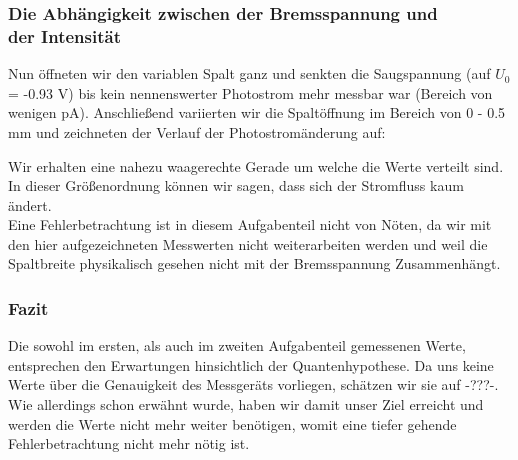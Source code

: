 \subsubsection{Die Abhängigkeit zwischen der Bremsspannung und\\ der Intensität}

Nun öffneten wir den variablen Spalt ganz und senkten die Saugspannung (auf \(U_0\) = -0.93 V) bis kein nennenswerter Photostrom mehr messbar war (Bereich von wenigen pA). Anschließend variierten wir die Spaltöffnung im Bereich von 0 - 0.5 mm und zeichneten der Verlauf der Photostromänderung auf: 

\begin{center}
\begin{minipage}{\linewidth}
\centering
{}
\label{sps}
\end{minipage}
\end{center}

Wir erhalten eine nahezu waagerechte Gerade um welche die Werte verteilt sind. In dieser Größenordnung können wir sagen, dass sich der Stromfluss kaum ändert.\\

Eine Fehlerbetrachtung ist in diesem Aufgabenteil nicht von Nöten, da wir mit den hier aufgezeichneten Messwerten nicht weiterarbeiten werden und weil die Spaltbreite physikalisch gesehen nicht mit der Bremsspannung Zusammenhängt.

\subsubsection{Fazit}
Die sowohl im ersten, als auch im zweiten Aufgabenteil gemessenen Werte, entsprechen den Erwartungen hinsichtlich der Quantenhypothese. Da uns keine Werte über die Genauigkeit des Messgeräts vorliegen, schätzen wir sie auf -???-. Wie allerdings schon erwähnt wurde, haben wir damit unser Ziel erreicht und werden die Werte nicht mehr weiter benötigen, womit eine tiefer gehende Fehlerbetrachtung nicht mehr nötig ist.